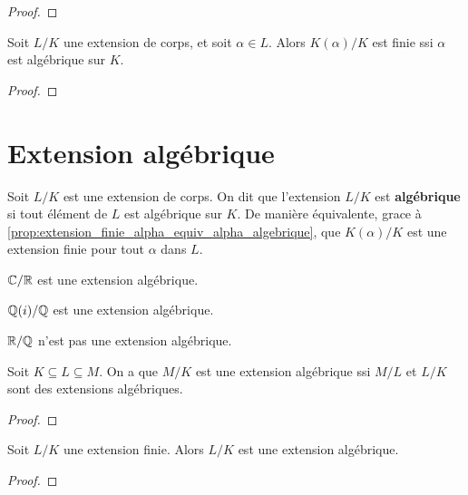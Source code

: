 \ifdefined\outputproof
\begin{proof}

\end{proof}
\fi

\begin{corollary}
	Soit $L/K$ une extension de corps, et soit $\alpha \in L$. Alors
	$K(\alpha)/K$ est finie ssi $\alpha$ est algébrique sur $K$.
\end{corollary}

\ifdefined\outputproof
\begin{proof}

\end{proof}
\fi

\section{Extension algébrique}

\begin{definition} 
	Soit $L/K$ est une extension de corps. On dit que l'extension $L/K$ est
	\textbf{algébrique} si tout élément de $L$ est algébrique sur $K$. De
	manière équivalente, grace à
	\ref{prop:extension_finie_alpha_equiv_alpha_algebrique}, que $K(\alpha)/K$
	est une extension finie pour tout $\alpha$ dans $L$.
\end{definition}

\begin{exemple}
	$\mathbb{C}/\mathbb{R}$ est une extension algébrique.

	$\mathbb{Q}(i)/\mathbb{Q}$ est une extension algébrique.

	$\mathbb{R}/\mathbb{Q}$ n'est pas une extension algébrique.
\end{exemple}

\begin{proposition}
	Soit $K \subseteq L \subseteq M$. On a que $M/K$ est une extension
	algébrique ssi $M/L$ et $L/K$ sont des extensions algébriques.
\end{proposition}

\ifdefined\outputproof
\begin{proof}

\end{proof}
\fi

\begin{proposition}
	Soit $L/K$ une extension finie. Alors $L/K$ est une extension algébrique.
\end{proposition}

\ifdefined\outputproof
\begin{proof}

\end{proof}
\fi

